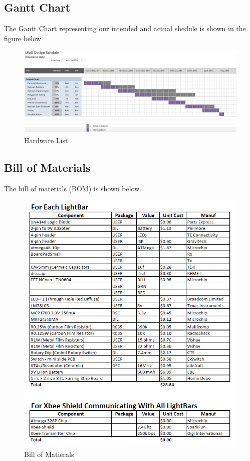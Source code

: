 \documentclass[12pt]{article}
\begin{document}
{{{{		\subsection{Gantt Chart}
			The Gantt Chart representing our intended and actual shedule is shown in the figure below
			\begin{figure}[ht!]
				\centering
				\includegraphics[width=170mm]{assets/Gantt_Chart_Shedule.png}
				\caption{Hardware List \label{overflow}}
			\end{figure}
		
		\subsection{Bill of Materials}
		The bill of materials (BOM) is shown below.
		
			\begin{figure}[ht!]
				\centering
				\includegraphics[width=170mm]{assets/Bill_of_Materials_Pg1.png}
				\caption{Bill of Matierals}
			\end{figure}
			
}}}}
\end{document}
